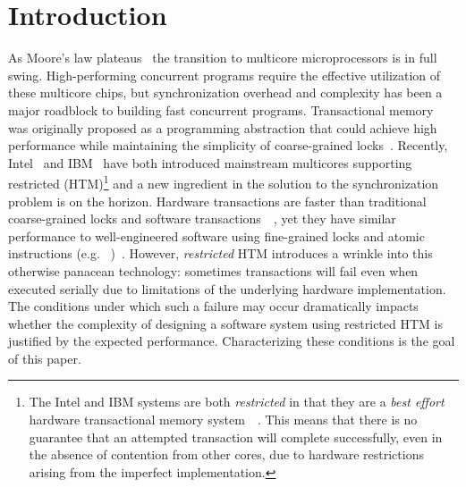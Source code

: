 \section{Introduction}




As Moore's law plateaus~\cite{Vardi14} the transition
to multicore microprocessors is in full swing. High-performing concurrent
programs require the effective utilization of these multicore chips, but 
synchronization overhead and complexity has been a
major roadblock to building fast concurrent programs.
Transactional memory~\cite{HerlihyMo93} was originally
proposed as a programming abstraction that could achieve
high performance while maintaining the simplicity of 
coarse-grained locks~\cite{YooHuLa13}.
Recently, Intel~\cite{Reinders12,IntelISAX12} and
IBM~\cite{CainMiFr13,Merritt11,IBMPower8Overview14} have both
introduced mainstream multicores supporting restricted  (HTM)\footnote{The Intel and IBM
systems are both \emph{restricted} in that they are 
a \emph{best effort} hardware transactional memory
system~\cite{Roman12,IntelISAX12}~\cite{CainMiFr13,IBMPower8Optimization14}.
This means that there is no guarantee that an attempted transaction will complete successfully, even in the absence 
of contention from other cores, due to hardware restrictions
arising from the imperfect implementation.}
and a new ingredient in the solution 
to the synchronization problem is
on the horizon. Hardware transactions are faster than traditional
coarse-grained locks and software
transactions~\cite{YooHuLa13}~\cite{CascavalBlMi08}, yet they have similar
performance to well-engineered software using fine-grained locks and atomic instructions (e.g.
~\cite{Herlihy91})~\cite{YooHuLa13}. 
However, \emph{restricted} HTM introduces a wrinkle into 
this otherwise panacean technology: sometimes transactions
will fail even when executed serially due to limitations
of the underlying hardware implementation.  The conditions
under which such a failure may occur dramatically impacts
whether the complexity of designing a software system using restricted HTM
is justified by the expected performance.  Characterizing
these conditions is the goal of this paper. 

